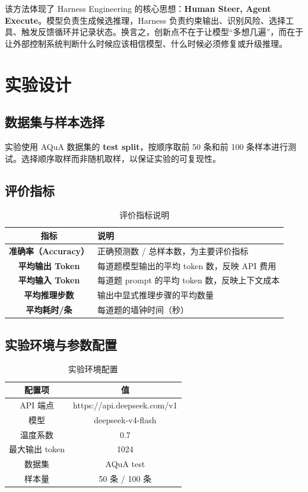 \documentclass[lang=cn,a4paper,newtx]{elegantpaper}
\begin{document}
该方法体现了 Harness Engineering 的核心思想：\textbf{Human Steer, Agent Execute}。模型负责生成候选推理，Harness 负责约束输出、识别风险、选择工具、触发反馈循环并记录状态。换言之，创新点不在于让模型“多想几遍”，而在于让外部控制系统判断什么时候应该相信模型、什么时候必须修复或升级推理。

\section{实验设计}

\subsection{数据集与样本选择}

实验使用 AQuA 数据集的 \textbf{test split}，按顺序取前 50 条和前 100 条样本进行测试。选择顺序取样而非随机取样，以保证实验的可复现性。

\subsection{评价指标}

\begin{table}[htbp]
\centering
\caption{评价指标说明}
\begin{tabular}{cp{10cm}}
\toprule
指标 & 说明 \\
\midrule
\textbf{准确率（Accuracy）} & 正确预测数 / 总样本数，为主要评价指标 \\
\textbf{平均输出 Token} & 每道题模型输出的平均 token 数，反映 API 费用 \\
\textbf{平均输入 Token} & 每道题 prompt 的平均 token 数，反映上下文成本 \\
\textbf{平均推理步数} & 输出中显式推理步骤的平均数量 \\
\textbf{平均耗时/条} & 每道题的墙钟时间（秒） \\
\bottomrule
\end{tabular}
\end{table}

\subsection{实验环境与参数配置}

\begin{table}[htbp]
\centering
\caption{实验环境配置}
\begin{tabular}{cc}
\toprule
配置项 & 值 \\
\midrule
API 端点 & https://api.deepseek.com/v1 \\
模型 & deepseek-v4-flash \\
温度系数 & 0.7 \\
最大输出 token & 1024 \\
数据集 & AQuA test \\
样本量 & 50 条 / 100 条 \\
\bottomrule
\end{tabular}
\end{table}
\end{document}
